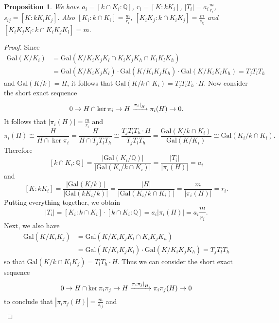 \documentclass[12pt,a4paper]{article}
\newtheorem{prop}[theorem]{Proposition}
\newcommand{\Q}{\mathbb{Q}}
\newcommand{\Gal}{\mathrm{Gal}}
\newcommand\restr[2]{{%
  \left.\kern-\nulldelimiterspace %
  #1 %
  \right|_{#2} %
  }}
\begin{document}
\begin{prop}\label{degrees}
We have $a_i=[k\cap K_i:\Q]$, $r_i=[K:kK_i]$, $|T_i|=a_i\frac{m}{r_i}$,  $s_{ij}=[K:kK_iK_j]$. Also $[K_i:k\cap K_i]=\frac{m}{r_i}$, $[K_iK_j:k\cap K_iK_j]=\frac{m}{s_{ij}}$ and $[K_iK_jK_l:k\cap K_iK_jK_l]=m$.
\end{prop}
\begin{proof}
Since
\begin{equation*}
\begin{split}
\Gal(K/K_i)&=\Gal(K/K_iK_jK_l\cap K_iK_jK_h\cap K_iK_lK_h)\\
&=\Gal(K/K_iK_jK_l)\cdot \Gal(K/K_iK_jK_h)\cdot \Gal(K/K_iK_lK_h)
= T_jT_lT_h
\end{split}
\end{equation*} 
 and $\Gal(K/k)=H$, it follows that $\Gal(K/k\cap K_i)= T_jT_lT_h\cdot H$. Now consider the short exact sequence %
$$0\to H\cap \ker \pi_i\to H \xrightarrow{\restr{\pi_i}{H}} \pi_i(H)\to 0.$$
It follows that $|\pi_i(H)|=\frac{m}{r_i}$ and $$\pi_i(H)\cong \frac{H}{H\cap \ker \pi_i}=\frac{H}{H\cap T_jT_lT_h}\cong \frac{T_jT_lT_h\cdot H}{T_jT_lT_h}= \frac{\Gal(K/k\cap K_i)}{\Gal(K/K_i)}\cong \Gal(K_i/k\cap K_i).$$
Therefore 
$$[k\cap K_i:\Q]=\frac{|\Gal(K_i/\Q)|}{|\Gal(K_i/k\cap K_i)|}=\frac{|T_i|}{|\pi_i(H)|}=a_i$$
and
$$[K:kK_i]=\frac{|\Gal(K/k)|}{|\Gal(kK_i/k)|}=\frac{|H|}{|\Gal(K_i/k\cap K_i)|}=\frac{m}{|\pi_i(H)|}=r_i.$$
Putting everything together, we obtain $$|T_i|=[K_i:k\cap K_i]\cdot[k\cap K_i:\Q]=a_i|\pi_i(H)|=a_i\frac{m}{r_i}.$$
Next, we also have 
\begin{equation*}
\begin{split}
\Gal(K/K_iK_j)&=\Gal(K/K_iK_jK_l\cap K_iK_jK_h)\\
&=\Gal(K/K_iK_jK_l)\cdot \Gal(K/K_iK_jK_h)= T_jT_lT_h
\end{split}
\end{equation*} 
so that $\Gal(K/k\cap K_iK_j)=T_lT_h\cdot H$. Thus we can consider the short exact sequence 
$$0\to H\cap \ker \pi_i\pi_j\to H \xrightarrow{\restr{\pi_i\pi_j}{H}} \pi_i\pi_j(H)\to 0$$
to conclude that $|\pi_i\pi_j(H)|=\frac{m}{s_{ij}}$ and 
\begin{equation*}
\begin{split}

\end{split}
\end{equation*}
\end{proof}
\end{document}
